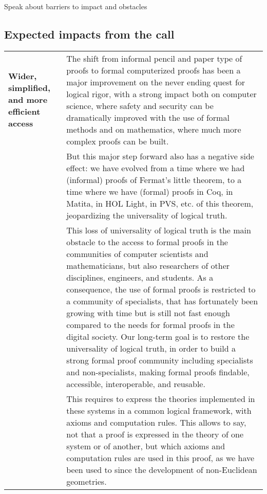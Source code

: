 {\color{red} Speak about barriers to impact and obstacles}

\subsection*{Expected impacts from the call}

\begin{longtable}{|p{}|p{}|}
\hline
{\bf Wider, simplified, and more efficient access}&
The shift from informal pencil and paper type of proofs to formal
computerized proofs has been a major improvement on the never ending
quest for logical rigor, with a strong impact both on computer
science, where safety and security can be dramatically improved with
the use of formal methods and on mathematics, where much more complex
proofs can be built.\\
&
\hspace{0.4cm}
But this major step forward also has a negative side effect: we have
evolved from a time where we had (informal) proofs of Fermat's little
theorem, to a time where we have (formal) proofs in Coq, in Matita, in
HOL Light, in PVS, etc.  of this theorem, jeopardizing the
universality of logical truth.\\
&
\hspace*{0.4cm} This loss of universality of logical truth is the main
obstacle to the access to formal proofs in the communities of computer
scientists and mathematicians, but also researchers of other
disciplines, engineers, and students. As a consequence, the use of
formal proofs is restricted to a community of specialists, that has
fortunately been growing with time but is still not fast enough
compared to the needs for formal proofs in the digital society.  Our
long-term goal is to restore the universality of logical truth, in
order to build a strong formal proof community including specialists
and non-specialists, making formal proofs findable, accessible,
interoperable, and reusable.\\ &
\hspace{0.4cm}
This requires to express the theories implemented in these systems in
a common logical framework, with axioms and computation rules. This allows
to say, not that a proof is expressed in the theory of one
system or of another, but which axioms and computation rules are used in
this proof, as we have been used to since the development of
non-Euclidean geometries.


\end{longtable}
